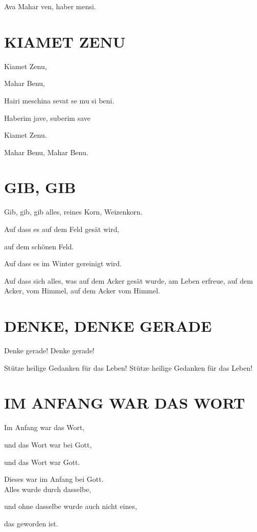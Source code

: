 \documentclass[11pt,a5paper,twoside]{article}
\begin{document}
Ava Mahar ven, haber mensi.



\section[Kiamet zenu]{KIAMET ZENU}

Kiamet Zenu,

Mahar Benu,

Hairi meschina sevat se mu si beni.

Haberim jave, suberim save

Kiamet Zenu.

Mahar Benu, Mahar Benu.


\section[Gib, gib]{GIB, GIB}

Gib, gib, gib alles, reines Korn, Weizenkorn.

Auf dass es auf dem Feld gesät wird,

auf dem schönen Feld.

Auf dass es im Winter gereinigt wird.

Auf dass sich alles, was auf dem Acker gesät wurde, am Leben erfreue, auf dem Acker, vom Himmel, auf dem Acker vom Himmel.

\section[Denke, denke gerade]{DENKE, DENKE GERADE}

Denke gerade! Denke gerade!

Stütze heilige Gedanken für das Leben! Stütze heilige Gedanken für das Leben!

\section[Im Anfang war das Wort]{IM ANFANG WAR DAS WORT}

Im Anfang war das Wort, 

und das Wort war bei Gott,

 und das Wort war Gott.
 
Dieses war im Anfang bei Gott.\\


Alles wurde durch dasselbe,

und ohne dasselbe wurde auch nicht eines, 

das geworden ist.\\
\end{document}
